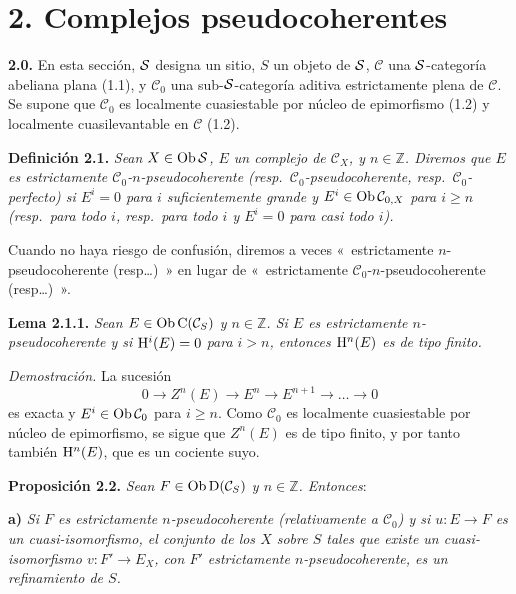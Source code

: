 
\section*{2. Complejos pseudocoherentes}

\textbf{2.0.} En esta sección, \(\sisi{S}{\mathcal S}\) designa un sitio, \(S\) un objeto de \(\sisi{S}{\mathcal S}\), \(\mathcal C\) una \(\sisi{S}{\mathcal S}\)-categoría abeliana plana (1.1), y \(\mathcal C_0\) una sub-\(\sisi{S}{\mathcal S}\)-categoría aditiva estrictamente plena de \(\mathcal C\). Se supone que \(\mathcal C_0\) es localmente cuasiestable por núcleo de epimorfismo (1.2) y localmente cuasilevantable en \(\mathcal C\) (1.2).

\textbf{Definición 2.1.} \emph{Sean \(X\in\Ob \sisi{S}{\mathcal S}\), \(E\) un complejo de \(\mathcal C_X\), y \(n\in\mathbb Z\). Diremos que \(E\) es estrictamente \(\mathcal C_0\)-\(n\)-pseudocoherente (resp.\ \(\mathcal C_0\)-pseudocoherente, resp.\ \(\mathcal C_0\)-perfecto) si \(E^i=0\) para \(i\) suficientemente grande y \(E^i\in\Ob\sisi{\mathcal C_{0,S}}{\mathcal C_{0,X}}\) para \(i\geq n\) (resp.\ para todo \(i\), resp.\ para todo \(i\) y \(E^i=0\) para casi todo \(i\)).}

Cuando no haya riesgo de confusión, diremos a veces «~estrictamente \(n\)-pseudocoherente (resp\dots)~» en lugar de «~estrictamente \(\mathcal C_0\)-\(n\)-pseudocoherente (resp\dots)~».

\textbf{Lema 2.1.1.} \emph{Sean \(E\in\Ob\Cpx(\mathcal C_S)\) y \(n\in\mathbb Z\). Si \(E\) es estrictamente \(n\)-pseudocoherente y si \(\Ho^i(E)=0\) para \(i>n\), entonces \(\Ho^n(E)\) es de tipo finito.}

\emph{Demostración.} La sucesión
\[
  0\longrightarrow Z^n(E)\longrightarrow E^n\longrightarrow E^{n+1}\longrightarrow\ldots\longrightarrow 0
\]
es exacta y \(E^i\in\Ob\mathcal C_0\) para \(i\geq n\). Como \(\mathcal C_0\) es localmente cuasiestable por núcleo de epimorfismo, se sigue que \(Z^n(E)\) es de tipo finito, y por tanto también \(\Ho^n(E)\), que es un cociente suyo.

\textbf{Proposición 2.2.} \emph{Sean \(F\in\Ob\Dpx(\mathcal C_S)\) y \(n\in\mathbb Z\). Entonces}:

\textbf{a)} \emph{Si \(F\) es estrictamente \(n\)-pseudocoherente (relativamente a \(\mathcal C_0\)) y si \(u:E\to F\) es un cuasi-isomorfismo, el conjunto de los \(X\) sobre \(S\) tales que existe un cuasi-isomorfismo \(v:F'\longrightarrow E_X\), con \(F'\) estrictamente \(n\)-pseudocoherente, es un refinamiento de \(S\).}

